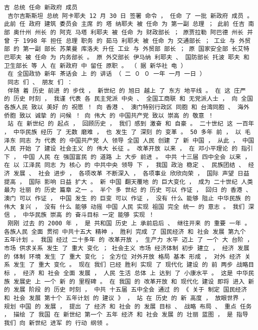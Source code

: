 \documentclass{article}
\begin{document}
\begin{Verbatim}[commandchars=\\\{\}]
 吉 总统 任命 新政府 成员 
 吉尔吉斯斯坦 总统 阿卡耶夫 12 月 30 日 签署 命令 ， 任命 了 一批 新政府 成员 。 此前 任 政府 建筑 委员会 主席 的 塔 纳耶夫 被 任命 为 第一副 总理 ； 此前 任吉 南部 奥什州 州长 的 阿克 马塔 利耶夫 被 任命 为 财政部长 ； 原贾拉勒 阿巴德 州长 并 曾 于 1998 年 担任 总理 职务 的 茹马 利耶夫 被 任命 为 交通部长 ； 工业 与 外贸部 的 第一副 部长 苏莱曼 库洛夫 升任 工业 与 外贸部 部长 ； 原 国家安全部 长艾特 巴耶夫 被 任命 为 内务部长 。 原 外交部长 伊马纳 利耶夫 、 国防部长 托波 耶夫 和 卫生部长 等 人 在 新政府 中 留任 原职 。 （ 据 新华社 电 ） 
 在 全国政协 新年 茶话会 上 的 讲话 （ 二 ０ ０ 一年 一月 一日 ） 
 同志 们 、 朋友 们 ： 
 伴随 着 历史 前进 的 步伐 ， 新世纪 的 旭日 越上 了 东方 地平线 。 在 这 庄严 的 历史 时刻 ， 我谨 代表 各 民主党派 中央 、 全国工商联 和 无党派人士 ， 向 全国 各族人民 致以 美好 的 祝愿 ！ 向 香港 、 澳门特别行政区 同胞 和 台湾同胞 、 海外侨胞 致以 诚挚 的 问候 ！ 向 伟大 的 中国共产党 致以 崇高 的 敬意 ！ 
 站 在 新世纪 的 起点 ， 回顾历史 ， 我们 感到 激奋 和 自豪 。 二十世纪 这 一百年 ， 中华民族 经历 了 无数 磨难 ， 也 发生 了 深刻 的 变革 。 50 多年 前 ， 以 毛泽东 同志 为 代表 的 中国共产党 人 领导 全国 人民 创建 了 新 中国 ， 从此 ， 中国 人民 开始 了 建设 社会主义 的 伟大 长征 。 改革开放 以来 ， 在 邓小平理论 的 指引 下 ， 中国 人民 在 强国富民 的 道路 上 大步 前进 。 中共 十三届 四中全会 以来 ， 在 以 江泽民 同志 为 核心 的 中共中央 领导 下 ， 我国 政治 稳定 、 民族团结 、 经济 发展 、 社会 进步 ， 各项改革 不断深入 ， 各项事业 欣欣向荣 ， 国际 声望 日益 提高 ， 国际 影响 日益 扩大 。 新 中国 翻天覆地 的 巨大变化 ， 成为 二十世纪 人类 最为 壮丽 的 历史 篇章 之一 。 半个 多 世纪 的 历史 可以 作证 ， 回归 的 香港 、 澳门 可以 作证 ， 中国 发生 的 巨变 可以 作证 ， 没有 什么 能够 阻止 中华民族 的 伟大 复兴 ， 没有 什么 能够 动摇 中国 人民 实现 祖国 完全 统一 的 意志 。 我们 深信 ， 中华民族 崇高 的 奋斗目标 一定 能够 实现 ！ 
 刚刚 过去 的 2000 年 ， 是 共和国 历史 上 承前启后 、 继往开来 的 重要 一年 。 各族人民 全面 贯彻 中共十五大 精神 ， 胜利 完成 了 国民经济 和 社会 发展 第九个 五年计划 。 我国 经过 二十多年 的 改革开放 ， 生产力 水平 迈上 了 一个 大 台阶 ， 市场 供求关系 发生 了 重大 变化 ； 社会主义 市场 经济体制 初步 建立 ， 经济 发展 的 体制 环境 发生 了 重大 变化 ； 全方位 对外开放 格局 基本 形成 ， 对外 经济 关系 发生 了 重大 变化 。 现在 我们 已经 胜利 实现 了 现代化 建设 的 前 两步 战略目标 ， 经济 和 社会 全面 发展 ， 人民 生活 总体 上 达到 了 小康水平 。 这是 中华民族 发展史 上 一个 新 的 里程碑 。 在 我国 的 改革开放 和 现代化 建设 即将 进入 新 的 发展 阶段 的 历史 时刻 ， 中共 十五届 五中全会 通过 的 《 关于 制定 国民经济 和 社会 发展 第十个 五年计划 的 建议 》 ， 站 在 历史 的 新 高度 ， 放眼世界 ， 规划 中国 的 发展 ， 提出 了 经济 和 社会 的 发展 目标 、 战略 布局 、 重点 任务 ， 描绘 了 我国 在 新世纪 第一个 五年 经济 和 社会 发展 的 壮丽 蓝图 ， 是 指导 我们 向 新世纪 进军 的 行动 纲领 。 

\end{Verbatim}
\end{document}
